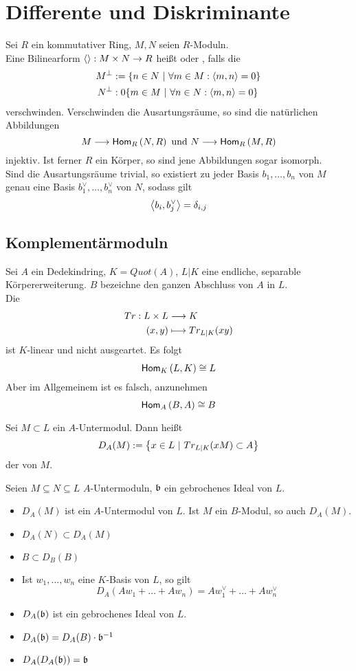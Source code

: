 \chapter{Differente und Diskriminante}
Sei $R$ ein kommutativer Ring, $M,N$ seien $R$-Moduln.\\
Eine Bilinearform $\shrp{} : M\times N \pfeil{} R$ heißt  oder , falls die 
\begin{align*}
M^\bot &:= \{n \in N ~|~ \forall m \in M : \shrp{m,n} = 0\}\\
N^\bot &:0 \{m \in M ~|~ \forall n \in N: \shrp{m,n} = 0\}
\end{align*}
verschwinden.
\Bem{}
Verschwinden die Ausartungsräume, so sind die natürlichen Abbildungen
\[ M \Pfeil{} \Hom{R}{N}{R} \text{ und } N \Pfeil{} \Hom{R}{M}{R} \]
injektiv. Ist ferner $R$ ein Körper, so sind jene Abbildungen sogar isomorph.\\
Sind die Ausartungsräume trivial, so existiert zu jeder Basis $b_1,\ldots, b_n$ von $M$ genau eine Basis $b_1^\vee,\ldots, b_n^\vee$ von $N$, sodass gilt
\[ \shrp{b_i,b_j^\vee} = \delta_{i,j} \]

\section{Komplementärmoduln}
\Bem{}
Sei $A$ ein Dedekindring, $K = Quot(A)$, $L|K$ eine endliche, separable Körpererweiterung. $B$ bezeichne den ganzen Abschluss von $A$ in $L$.\\
Die 
\begin{align*}
Tr : L\times L &\Pfeil{} K\\
(x,y) & \longmapsto Tr_{L|K}(xy)
\end{align*}
ist $K$-linear und nicht ausgeartet. Es folgt
\[ \Hom{K}{L}{K} \isom{} L \]
Aber im Allgemeinem ist es falsch, anzunehmen
\[ \Hom{A}{B}{A} \isom{} B \]

Sei $M\subset L$ ein $A$-Untermodul. Dann heißt
\[ D_A(M) := \set{x\in L}{Tr_{L|K}(xM) \subset A} \]
der  von $M$.

\Satz{}
Seien $M \subseteq N \subseteq L$ $A$-Untermoduln, $\bf$ ein gebrochenes Ideal von $L$.
\begin{itemize}
	\item $D_A(M)$ ist ein $A$-Untermodul von $L$. Ist $M$ ein $B$-Modul, so auch $D_A(M)$.
	\item $D_A(N) \subset D_A(M)$
	\item $B \subset D_B(B)$
	\item Ist $w_1,\ldots,w_n$ eine $K$-Basis von $L$, so gilt
	\[ D_A(Aw_1 + \ldots + Aw_n) = Aw_1^\vee + \ldots + Aw_n^\vee \]
	\item $D_A(\bf)$ ist ein gebrochenes Ideal von $L$.
	\item $D_A(\bf) = D_A(B)\cdot \bf\i$
	\item $D_A(D_A(\bf)) = \bf$
\end{itemize}

